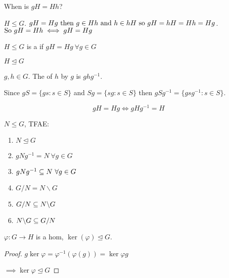 \documentclass[12pt]{article}
\newcommand\vphi{\varphi}
\newcommand\sgq{\le}
\newcommand\nsgq{\mathrel{\unlhd}}
\begin{document}
When is \(gH=Hh\)?

\(H\le G\). \(gH=Hg\ \tthen\ g\in Hh\ \TR{and}\ h\in hH\ \TR{so}\ gH=hH=Hh=Hg\).
\(\TR{So}\ gH=Hh\iff gH=Hg\)

\bboxdefn
\begin{defn}
    \(H\le G\) is a  if \(gH=Hg\ \forall g\in G\)
\end{defn}
\ebox

\bboxnota
\begin{nota}
    \(H\nsgq G\)
\end{nota}
\ebox

\bboxdefn
\begin{defn}[Conjugate]
    \(g,h\in G\). The  of \(h\) by \(g\) is \(ghg^{-1}\).
\end{defn}
\ebox

\bboxnote
\begin{note}
    Since \(gS=\{gs:s\in S\}\) and \(Sg=\{sg:s\in S\}\) then
    \(gSg^{-1}=\{gsg^{-1}:s\in S\}\).
    
    \[
        gH=Hg\iff gHg^{-1}=H
    \]
\end{note}
\ebox

\bboxprop
\begin{prop}
    \(N\sgq G\), TFAE:
    \begin{enumerate}
        \item \(N\nsgq G\)
        \item \(gNg^{-1}=N\ \forall g\in G\)
        \item \(gNg^{-1}\subseteq N\ \forall g\in G\)
        \item \(G/N=N\backslash G\)
        \item \(G/N\subseteq N\backslash G\)
        \item \(N\backslash G\subseteq G/N\)
    \end{enumerate}
\end{prop}
\ebox

\bboxexam
\begin{exam}
    \(\vphi:G\to H\) is a hom, \(\ker(\vphi)\nsgq G\).
\end{exam}
\ebox
\bboxproof
\begin{proof}
    \(g\ker\vphi=\vphi^{-1}(\vphi(g))=\ker\vphi g\)

    \(\implies \ker\vphi\nsgq G\)
\end{proof}
\ebox


\end{document}
